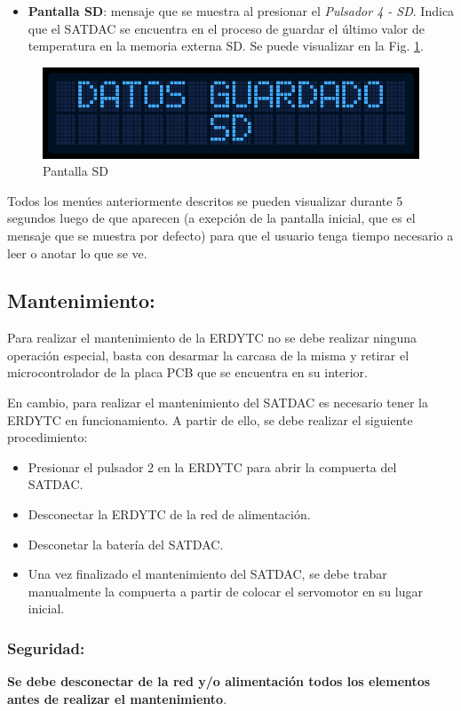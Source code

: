 \documentclass[conference]{IEEEtran}
\begin{document}
\begin{itemize}
\item \textbf{Pantalla SD}: mensaje que se muestra al presionar el \emph{Pulsador 4 - SD}. Indica que el SATDAC se encuentra en el proceso de guardar el último valor de temperatura en la memoria externa SD. Se puede visualizar en la Fig. \ref{fig:pantallaSD}.
\end{itemize}

\begin{figure}[htbp]
\centering
\includegraphics[width=.9\linewidth]{../../images/pantallaSD.png}
\caption{\label{fig:pantallaSD}Pantalla SD}
\end{figure}

Todos los menúes anteriormente descritos se pueden visualizar durante 5 segundos luego de que aparecen (a exepción de la pantalla inicial, que es el mensaje que se muestra por defecto) para que el usuario tenga tiempo necesario a leer o anotar lo que se ve.
\subsection{Mantenimiento:}
\label{sec:org9ac3928}
Para realizar el mantenimiento de la ERDYTC no se debe realizar ninguna operación especial, basta con desarmar la carcasa de la misma y retirar el microcontrolador de la placa PCB que se encuentra en su interior.

En cambio, para realizar el mantenimiento del SATDAC es necesario tener la ERDYTC en funcionamiento. A partir de ello, se debe realizar el siguiente procedimiento:

\begin{itemize}
\item Presionar el pulsador 2 en la ERDYTC para abrir la compuerta del SATDAC.
\item Desconectar la ERDYTC de la red de alimentación.
\item Desconetar la batería del SATDAC.
\item Una vez finalizado el mantenimiento del SATDAC, se debe trabar manualmente la compuerta a partir de colocar el servomotor en su lugar inicial.
\end{itemize}
\subsubsection{Seguridad:}
\label{sec:org6f65f9e}
\textbf{Se debe desconectar de la red y/o alimentación todos los elementos antes de realizar el mantenimiento}.
\end{document}
